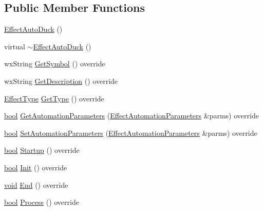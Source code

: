 \subsection*{Public Member Functions}
\begin{DoxyCompactItemize}
\item 
\hyperlink{class_effect_auto_duck_aa60461caaaa637f8e24fdf9b630e69a8}{Effect\+Auto\+Duck} ()
\item 
virtual \hyperlink{class_effect_auto_duck_a9328416bed39a223602322c74ddf3cd8}{$\sim$\+Effect\+Auto\+Duck} ()
\item 
wx\+String \hyperlink{class_effect_auto_duck_a49b925b81f84e3d536f477f3f4b07f1f}{Get\+Symbol} () override
\item 
wx\+String \hyperlink{class_effect_auto_duck_a218f2b1b87efca0638354f5c1e5bb9f7}{Get\+Description} () override
\item 
\hyperlink{_effect_interface_8h_a4809a7bb3fd1a421902a667cc1405d43}{Effect\+Type} \hyperlink{class_effect_auto_duck_a16cc38e2db2a26de15ff454e3ea221dd}{Get\+Type} () override
\item 
\hyperlink{mac_2config_2i386_2lib-src_2libsoxr_2soxr-config_8h_abb452686968e48b67397da5f97445f5b}{bool} \hyperlink{class_effect_auto_duck_a7cc304ccbd96c9b8d5fc9aaecab69a82}{Get\+Automation\+Parameters} (\hyperlink{class_effect_automation_parameters}{Effect\+Automation\+Parameters} \&parms) override
\item 
\hyperlink{mac_2config_2i386_2lib-src_2libsoxr_2soxr-config_8h_abb452686968e48b67397da5f97445f5b}{bool} \hyperlink{class_effect_auto_duck_a531bfb96e7f898b0fbca7842b2dccc52}{Set\+Automation\+Parameters} (\hyperlink{class_effect_automation_parameters}{Effect\+Automation\+Parameters} \&parms) override
\item 
\hyperlink{mac_2config_2i386_2lib-src_2libsoxr_2soxr-config_8h_abb452686968e48b67397da5f97445f5b}{bool} \hyperlink{class_effect_auto_duck_aef0d3469118bf08a8fd97fb5df6f2404}{Startup} () override
\item 
\hyperlink{mac_2config_2i386_2lib-src_2libsoxr_2soxr-config_8h_abb452686968e48b67397da5f97445f5b}{bool} \hyperlink{class_effect_auto_duck_a44f499ebebf6b86d30fb44a5d2fb78b7}{Init} () override
\item 
\hyperlink{sound_8c_ae35f5844602719cf66324f4de2a658b3}{void} \hyperlink{class_effect_auto_duck_a2c650875598de07b220407ff339f81cb}{End} () override
\item 
\hyperlink{mac_2config_2i386_2lib-src_2libsoxr_2soxr-config_8h_abb452686968e48b67397da5f97445f5b}{bool} \hyperlink{class_effect_auto_duck_ae2b2d4a063e93e3e1662c06129164d8d}{Process} () override

\end{DoxyCompactItemize}
